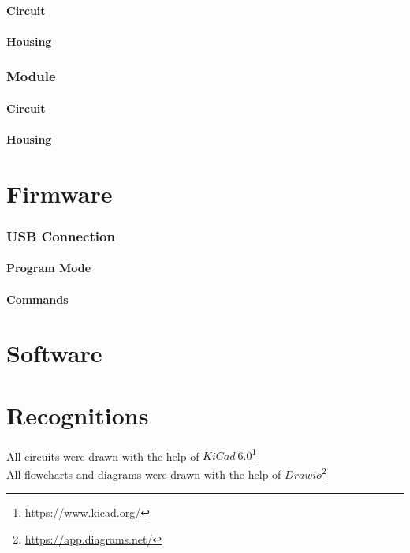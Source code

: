 \paragraph{Circuit}
\paragraph{Housing}

\subsubsection{Module}
\label{Module}
\paragraph{Circuit}
\paragraph{Housing}


\section{Firmware}
\label{Firmware}

\subsubsection{USB Connection}
\label{USB Connection}
\paragraph{Program Mode}
\paragraph{Commands}


\section{Software}
\label{Software}

\pagebreak

\section{Recognitions}
\label{Recognitions}
All circuits were drawn with the help of $KiCad\ 6.0$\footnote{\url{https://www.kicad.org/}}\\

\noindent All flowcharts and diagrams were drawn with the help of $Drawio$\footnote{\url{https://app.diagrams.net/}}




